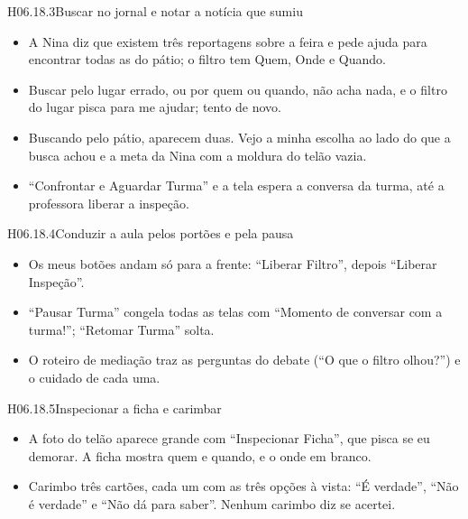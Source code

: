 \begin{historia}{H06.18.3}{Buscar no jornal e notar a notícia que sumiu}{\pronto}
\aceite
\begin{itemize}
  \item A Nina diz que existem três reportagens sobre a feira e pede ajuda
    para encontrar todas as do pátio; o filtro tem Quem, Onde e Quando.
  \item Buscar pelo lugar errado, ou por quem ou quando, não acha nada, e o
    filtro do lugar pisca para me ajudar; tento de novo.
  \item Buscando pelo pátio, aparecem duas. Vejo a minha escolha ao lado do
    que a busca achou e a meta da Nina com a moldura do telão vazia.
  \item \enquote{Confrontar e Aguardar Turma} e a tela espera a conversa da
    turma, até a professora liberar a inspeção.
\end{itemize}
\end{historia}

\begin{historia}{H06.18.4}{Conduzir a aula pelos portões e pela pausa}{\pronto}
\aceite
\begin{itemize}
  \item Os meus botões andam só para a frente: \enquote{Liberar Filtro},
    depois \enquote{Liberar Inspeção}.
  \item \enquote{Pausar Turma} congela todas as telas com \enquote{Momento de
    conversar com a turma!}; \enquote{Retomar Turma} solta.
  \item O roteiro de mediação traz as perguntas do debate (\enquote{O que o
    filtro olhou?}) e o cuidado de cada uma.
\end{itemize}
\end{historia}

\begin{historia}{H06.18.5}{Inspecionar a ficha e carimbar}{\pronto}
\aceite
\begin{itemize}
  \item A foto do telão aparece grande com \enquote{Inspecionar Ficha}, que
    pisca se eu demorar. A ficha mostra quem e quando, e o onde em branco.
  \item Carimbo três cartões, cada um com as três opções à vista: \enquote{É
    verdade}, \enquote{Não é verdade} e \enquote{Não dá para saber}. Nenhum
    carimbo diz se acertei.
\end{itemize}
\end{historia}

